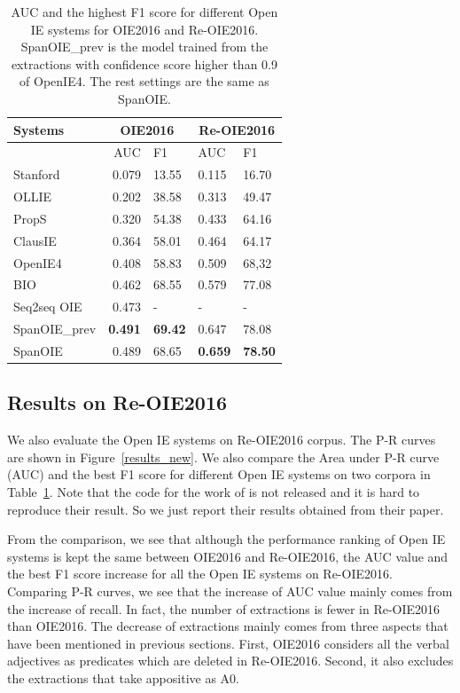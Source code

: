 \documentclass[letterpaper]{article} %
\begin{document}
\begin{table}[t!]
\begin{center}
\begin{tabular}{|l|rl|ll|}

\hline \textbf{Systems} & \multicolumn{2}{|c|}{\textbf{OIE2016}} & \multicolumn{2}{|c|}{\textbf{Re-OIE2016}} \\ \hline
& AUC & F1 &AUC &F1 \\
\hline
Stanford \cite{Angeli2015LeveragingLS} & 0.079 & 13.55& 0.115 & 16.70\\
OLLIE \cite{Mausam2012OpenLL} & 0.202 &38.58 & 0.313 & 49.47\\
PropS \cite{Stanovsky2016GettingMO} & 0.320 & 54.38& 0.433 & 64.16\\
ClausIE \cite{Corro2013ClausIECO} & 0.364 & 58.01& 0.464 & 64.17\\
OpenIE4 \cite{Mausam2016OpenIE} & 0.408 & 58.83& 0.509 & 68,32\\
\hline
BIO & 0.462 & 68.55 & 0.579 & 77.08\\
Seq2seq OIE \cite{Cui2018NeuralOI} & 0.473 & - & - & - \\
SpanOIE\_prev  &\textbf{0.491} & \textbf{69.42}& 0.647 & 78.08\\
SpanOIE & 0.489 & 68.65& \textbf{0.659} & \textbf{78.50}\\
\hline
\end{tabular}
\end{center}
\caption{\label{auc} AUC and the highest F1 score for different Open IE systems for OIE2016 and Re-OIE2016. SpanOIE\_prev is the model trained from the extractions with confidence score higher than 0.9 of OpenIE4. The rest settings are the same as SpanOIE.}
\end{table}

\subsection{Results on Re-OIE2016}
We also evaluate the Open IE systems on Re-OIE2016 corpus. The P-R curves are shown in Figure~\ref{results_new}. We also compare the Area under P-R curve (AUC) and the best F1 score for different Open IE systems on two corpora in Table~\ref{auc}. Note that the code for the work of \cite{Cui2018NeuralOI} is not released and it is hard to reproduce their result. So we just report their results obtained from their paper. 

From the comparison, we see that although the performance ranking of Open IE systems is kept the same between OIE2016 and Re-OIE2016, the AUC value and the best F1 score increase for all the Open IE systems on Re-OIE2016. Comparing P-R curves, we see that the increase of AUC value mainly comes from the increase of recall. In fact, the number of extractions is fewer in Re-OIE2016 than OIE2016. The decrease of extractions mainly comes from three aspects that have been mentioned in previous sections. First, OIE2016 considers all the verbal adjectives as predicates which are deleted in Re-OIE2016. Second, it also excludes the extractions that take appositive as A0. 
\end{document}
